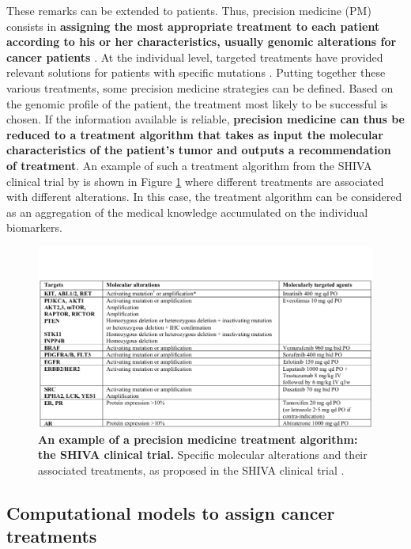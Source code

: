 \documentclass[a4paper,12pt,twoside,onecolumn,openright,final,oldfontcommands]{memoir}
\begin{document}
These remarks can be extended to patients. Thus, precision medicine (PM)
consists in \textbf{assigning the most appropriate treatment to each
patient according to his or her characteristics, usually genomic
alterations for cancer patients}
\citep{friedman2015precision, de2015pragmatic}. At the individual level,
targeted treatments have provided relevant solutions for patients with
specific mutations \citep{abou2003overview}. Putting together these
various treatments, some precision medicine strategies can be defined.
Based on the genomic profile of the patient, the treatment most likely
to be successful is chosen. If the information available is reliable,
\textbf{precision medicine can thus be reduced to a treatment algorithm
that takes as input the molecular characteristics of the patient's tumor
and outputs a recommendation of treatment}. An example of such a
treatment algorithm from the SHIVA clinical trial by
\citet{le2015molecularly} is shown in Figure \ref{fig:SHIVA} where
different treatments are associated with different alterations. In this
case, the treatment algorithm can be considered as an aggregation of the
medical knowledge accumulated on the individual biomarkers.

\begin{figure}

{\centering \includegraphics[width=0.8\linewidth]{fig/SHIVA_algo} 

}

\caption[An example of a precision medicine treatment algorithm: the SHIVA clinical trial]{\textbf{An example of a precision medicine treatment
algorithm: the SHIVA clinical trial.} Specific molecular alterations and
their associated treatments, as proposed in the SHIVA clinical trial
\citep{le2015molecularly}.}\label{fig:SHIVA}
\end{figure}






\subsection{Computational models to assign cancer
treatments}\label{computational-models-to-assign-cancer-treatments}
\end{document}
